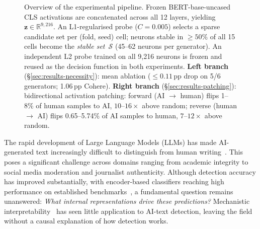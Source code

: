 \documentclass[11pt]{article}
\newcommand{\bertbase}{BERT-base-uncased\xspace}
\begin{document}
\begin{figure}[!t]
{%
}
\caption{Overview of the experimental pipeline. Frozen \bertbase CLS activations are concatenated across all 12 layers, yielding $\mathbf{z}\in\mathbb{R}^{9{,}216}$. An L1-regularised probe ($C\!=\!0.005$) selects a sparse candidate set per (fold, seed) cell; neurons stable in ${\geq}50\%$ of all 15 cells become the \textit{stable set}~$\mathcal{S}$ (45--62 neurons per generator). An independent L2 probe trained on all 9{,}216 neurons is frozen and reused as the decision function in both experiments. \textbf{Left branch} (\S\ref{sec:results-necessity}): mean ablation ($\leq\!0.11$\,pp drop on 5/6 generators; 1.06\,pp Cohere). \textbf{Right branch} (\S\ref{sec:results-patching}): bidirectional activation patching: forward (AI $\to$ human) flips 1--8\% of human samples to AI, $10\text{--}16\times$ above random; reverse (human $\to$ AI) flips 0.65--5.74\% of AI samples to human, $7\text{--}12\times$ above random.}
\label{fig:pipeline}
\end{figure}

The rapid development of Large Language Models (LLMs) has made AI-generated text increasingly difficult to distinguish from human writing~\cite{dugan2024raid}. This poses a significant challenge across domains ranging from academic integrity to social media moderation and journalist authenticity. Although detection accuracy has improved substantially, with encoder-based classifiers reaching high performance on established benchmarks~\cite{dugan2024raid}, a fundamental question remains unanswered: \textit{What internal representations drive these predictions?} Mechanistic interpretability~\citep{elhage2021framework,bereska2024mechanistic} has seen little application to AI-text detection, leaving the field without a causal explanation of how detection works.
\end{document}
